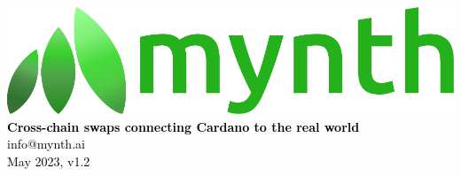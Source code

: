 \documentclass{article}
\begin{document}
\begin{sloppypar}

\begin{titlepage}
\sffamily\selectfont
\centering
\vspace*{7cm}
{\includegraphics[width=15cm]{
mynth-logo.pdf}}\\[5\baselineskip]
\textcolor{black}{
{\Large \textbf{Cross-chain swaps connecting Cardano to the real world}}\\[2\baselineskip]
{\large info@mynth.ai}\\[3\baselineskip]
{\large May 2023, v1.2}
}
\end{titlepage}

\tableofcontents



\end{sloppypar}
\end{document}
